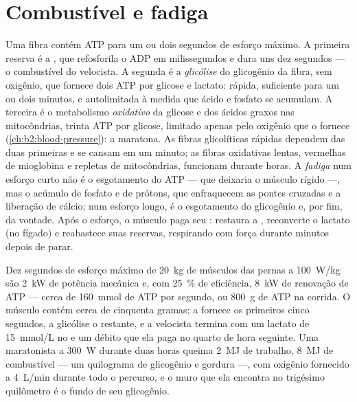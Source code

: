 \section{Combustível e fadiga}

\begin{proposition}\label{prop:b2:muscle-movement:energy}
Uma fibra contém ATP para um ou dois segundos de esforço máximo. A
primeira reserva é a \emph{}, que refosforila o ADP em
milissegundos e dura uns dez segundos --- o combustível do velocista. A
segunda é a \emph{glicólise} do glicogênio da fibra, sem oxigênio, que
fornece dois ATP por glicose e lactato: rápida, suficiente para um ou
dois minutos, e autolimitada à medida que ácido e fosfato se acumulam.
A terceira é o metabolismo \emph{oxidativo} da glicose e dos ácidos
graxos nas mitocôndrias, trinta ATP por glicose, limitado apenas pelo
oxigênio que o  fornece (\cref{ch:b2:blood-pressure}): a maratona. As fibras
glicolíticas rápidas dependem das duas primeiras e se cansam em um
minuto; as fibras oxidativas lentas, vermelhas de mioglobina e repletas
de mitocôndrias, funcionam durante horas. A \emph{fadiga} num esforço
curto não é o esgotamento do ATP --- que deixaria o músculo rígido ---,
mas o acúmulo de fosfato e de prótons, que enfraquecem as pontes
cruzadas e a liberação de cálcio; num esforço longo, é o esgotamento do
glicogênio e, por fim, da vontade. Após o esforço, o músculo paga seu
\emph{}: restaura a , reconverte o
lactato (no fígado) e reabastece suas reservas, respirando com força
durante minutos depois de parar.
\end{proposition}

\begin{example}\label{ex:b2:muscle-movement:sprint}
Dez segundos de esforço máximo de \qty{20}{kg} de músculos das pernas a
\qty{100}{W/kg} são \qty{2}{kW} de potência mecânica e, com
\qty{25}{\%} de eficiência, \qty{8}{kW} de renovação de ATP --- cerca de
\qty{160}{mmol} de ATP por segundo, ou \qty{800}{g} de ATP na corrida.
O músculo contém cerca de cinquenta gramas; a  fornece os primeiros
cinco segundos, a glicólise o restante, e a velocista termina com um
lactato de \qty{15}{mmol/L} no  e um débito que ela paga no quarto
de hora seguinte. Uma maratonista a \qty{300}{W} durante duas horas
queima \qty{2}{MJ} de trabalho, \qty{8}{MJ} de combustível --- um
quilograma de glicogênio e gordura ---, com oxigênio fornecido a
\qty{4}{L/min} durante todo o percurso, e o muro que ela encontra no
trigésimo quilômetro é o fundo de seu glicogênio.
\end{example}

